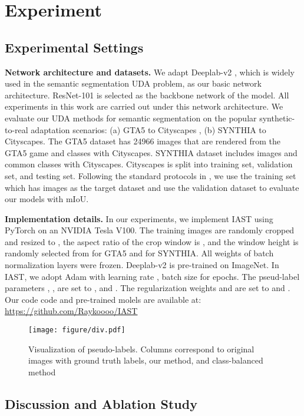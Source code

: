 \documentclass[runningheads]{llncs}
\begin{document}
 
\section{Experiment}
\subsection{Experimental Settings}
\noindent\textbf{Network architecture and datasets.} We adapt Deeplab-v2 \cite{chen2017deeplab}, which is widely used in the semantic segmentation UDA problem, as our basic network architecture. ResNet-101\cite{he2016deep} is selected as the backbone network of the model. All experiments in this work are carried out under this network architecture. We evaluate our UDA methods for semantic segmentation on the popular synthetic-to-real adaptation scenarios: (a) GTA5 \cite{richter2016playing} to Cityscapes \cite{cordts2016cityscapes}, (b) SYNTHIA \cite{ros2016synthia} to Cityscapes. The GTA5 dataset has 24966 images that are rendered from the GTA5 game and  classes with Cityscapes. SYNTHIA dataset includes  images and  common classes with Cityscapes. Cityscapes is split into training set, validation set, and testing set. Following the standard protocols in \cite{tsai2018learning}, we use the training set which has  images as the target dataset and use the validation dataset to evaluate our models with mIoU.


\noindent\textbf{Implementation details.} In our experiments, we implement IAST using PyTorch on an NVIDIA Tesla V100. The training images are randomly cropped and resized to , the aspect ratio of the crop window is , and the window height is randomly selected from  for GTA5 and  for SYNTHIA. All weights of batch normalization layers were frozen. Deeplab-v2 is pre-trained on ImageNet. In IAST, we adopt Adam with learning rate , batch size  for  epochs. The pseud-label parameters , ,  are set to ,  and . The regularization weights  and  are set to  and . Our code code and pre-trained molels are available at: \url{https://github.com/Raykoooo/IAST}



\begin{figure}[!htb] 
    \centering 
    \texttt{[image: figure/div.pdf]} 
    \caption{Visualization of pseudo-labels. Columns correspond to original images with ground truth labels, our method, and class-balanced method \cite{zou2018unsupervised}}
    \label{fig:div} 
\end{figure}

\subsection{Discussion and Ablation Study}
\end{document}

